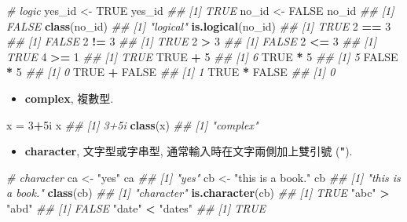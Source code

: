 \documentclass[
]{book}
\newenvironment{Shaded}{\begin{snugshade}}{\end{snugshade}}
\newcommand{\CommentTok}[1]{\textcolor[rgb]{0.56,0.35,0.01}{\textit{#1}}}
\newcommand{\DecValTok}[1]{\textcolor[rgb]{0.00,0.00,0.81}{#1}}
\newcommand{\KeywordTok}[1]{\textcolor[rgb]{0.13,0.29,0.53}{\textbf{#1}}}
\newcommand{\NormalTok}[1]{#1}
\newcommand{\OperatorTok}[1]{\textcolor[rgb]{0.81,0.36,0.00}{\textbf{#1}}}
\newcommand{\OtherTok}[1]{\textcolor[rgb]{0.56,0.35,0.01}{#1}}
\newcommand{\StringTok}[1]{\textcolor[rgb]{0.31,0.60,0.02}{#1}}
\providecommand{\tightlist}{%
  \setlength{\itemsep}{0pt}\setlength{\parskip}{0pt}}
\begin{document}
\begin{Shaded}
\begin{Highlighting}[]
\CommentTok{\# logic}
\NormalTok{yes\_id \textless{}{-}}\StringTok{ }\OtherTok{TRUE}
\NormalTok{yes\_id}
\CommentTok{\#\# [1] TRUE}
\NormalTok{no\_id \textless{}{-}}\StringTok{ }\OtherTok{FALSE}
\NormalTok{no\_id}
\CommentTok{\#\# [1] FALSE}
\KeywordTok{class}\NormalTok{(no\_id)}
\CommentTok{\#\# [1] "logical"}
\KeywordTok{is.logical}\NormalTok{(no\_id)}
\CommentTok{\#\# [1] TRUE}
\DecValTok{2} \OperatorTok{==}\StringTok{ }\DecValTok{3}
\CommentTok{\#\# [1] FALSE}
\DecValTok{2} \OperatorTok{!=}\StringTok{ }\DecValTok{3}
\CommentTok{\#\# [1] TRUE}
\DecValTok{2} \OperatorTok{\textgreater{}}\StringTok{ }\DecValTok{3}
\CommentTok{\#\# [1] FALSE}
\DecValTok{2} \OperatorTok{\textless{}=}\StringTok{ }\DecValTok{3}
\CommentTok{\#\# [1] TRUE}
\DecValTok{4} \OperatorTok{\textgreater{}=}\StringTok{ }\DecValTok{1}
\CommentTok{\#\# [1] TRUE}
\OtherTok{TRUE} \OperatorTok{+}\StringTok{ }\DecValTok{5}
\CommentTok{\#\# [1] 6}
\OtherTok{TRUE} \OperatorTok{*}\StringTok{ }\DecValTok{5}
\CommentTok{\#\# [1] 5}
\OtherTok{FALSE} \OperatorTok{*}\StringTok{ }\DecValTok{5}
\CommentTok{\#\# [1] 0}
\OtherTok{TRUE} \OperatorTok{+}\StringTok{ }\OtherTok{FALSE}
\CommentTok{\#\# [1] 1}
\OtherTok{TRUE} \OperatorTok{*}\StringTok{ }\OtherTok{FALSE}
\CommentTok{\#\# [1] 0}
\end{Highlighting}
\end{Shaded}

\begin{itemize}
\tightlist
\item
  \textbf{complex}, 複數型.
\end{itemize}

\begin{Shaded}
\begin{Highlighting}[]
\NormalTok{x =}\StringTok{ }\DecValTok{3}\OperatorTok{+}\NormalTok{5i}
\NormalTok{x}
\CommentTok{\#\# [1] 3+5i}
\KeywordTok{class}\NormalTok{(x)}
\CommentTok{\#\# [1] "complex"}
\end{Highlighting}
\end{Shaded}

\begin{itemize}
\tightlist
\item
  \textbf{character}, 文字型或字串型, 通常輸入時在文字兩側加上雙引號 (\textbf{"}).
\end{itemize}

\begin{Shaded}
\begin{Highlighting}[]
\CommentTok{\# character}
\NormalTok{ca \textless{}{-}}\StringTok{ "yes"}
\NormalTok{ca}
\CommentTok{\#\# [1] "yes"}
\NormalTok{cb \textless{}{-}}\StringTok{ "this is a book."}
\NormalTok{cb}
\CommentTok{\#\# [1] "this is a book."}
\KeywordTok{class}\NormalTok{(cb)}
\CommentTok{\#\# [1] "character"}
\KeywordTok{is.character}\NormalTok{(cb)}
\CommentTok{\#\# [1] TRUE}
\StringTok{"abc"} \OperatorTok{\textgreater{}}\StringTok{ "abd"}
\CommentTok{\#\# [1] FALSE}
\StringTok{"date"} \OperatorTok{\textless{}}\StringTok{ "dates"}
\CommentTok{\#\# [1] TRUE}
\end{Highlighting}
\end{Shaded}
\end{document}
